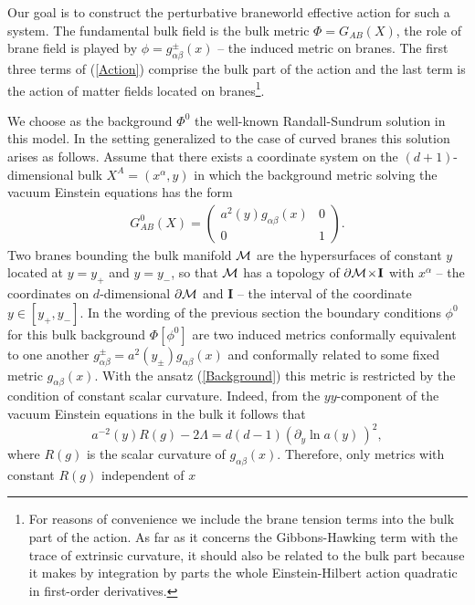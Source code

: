 \documentclass[a4paper,12pt]{article}
\newcommand{\za}{{\alpha}}   %
\newcommand{\zb}{{\beta}}    %
\newcommand{\ZA}{{A}}   %
\newcommand{\ZB}{{B}}   %
\newcommand{\p}{{+}}
\newcommand{\n}{{-}}
\newcommand{\ddim}{{d}}
\newcommand{\M}{{\cal M}}
\newcommand{\dM}{{\partial \cal M}}
\newcommand{\I}{{\mathbf{I}}}
\newcommand{\ddy}{{\partial_y}}
\begin{document}
Our goal is to construct the perturbative braneworld effective
action for such a system. The fundamental bulk field is the bulk
metric $\Phi=G_{\ZA\ZB}(X)$, the role of brane field is played by
$\phi=g^\pm_{\za\zb}(x)$ -- the induced metric on branes. The
first three terms of (\ref{Action}) comprise the bulk part of the
action and the last term is the action of matter fields located on
branes\footnote{For reasons of convenience we include the brane
tension terms into the bulk part of the action. As far as it
concerns the Gibbons-Hawking term with the trace of extrinsic
curvature, it should also be related to the bulk part because it
makes by integration by parts the whole Einstein-Hilbert action
quadratic in first-order derivatives.}.

We choose as the background $\Phi^0$ the well-known
Randall-Sundrum solution in this model. In the setting generalized
to the case of curved branes this solution arises as follows.
Assume that there exists a coordinate system on the
$(d+1)$-dimensional bulk $X^\ZA=(x^\za,y)$ in which the background
metric solving the vacuum Einstein equations has the form
    \begin{eqnarray}
     G^0_{\ZA\ZB}(X)= \left(\begin{array}{cc}
     a^2(y)g_{\za\zb}(x) & 0\\
     0 & 1 \end{array}\right).        \label{Background}
    \end{eqnarray}
Two branes bounding the bulk manifold $\M$ are the hypersurfaces of
constant $y$ located at $y=y_\p$ and $y=y_\n$, so that $\M$
has a topology of $\dM\!\times\!\I$ with $x^\za$ -- the
coordinates on $\ddim$-dimensional $\dM$ and $\I$ -- the
interval of the coordinate $y\in[y_\p,y_\n]$. In the wording of
the previous section the boundary conditions $\phi^0$ for this
bulk background $\Phi[\phi^0]$ are two induced metrics conformally
equivalent to one another $g^\pm_{\za\zb}=a^2(y_\pm)g_{\za\zb}(x)$
and conformally related to some fixed metric $g_{\alpha\beta}(x)$. With
the ansatz (\ref{Background}) this metric is restricted by the
condition of constant scalar curvature. Indeed, from the $yy$-component
of the vacuum Einstein equations in the bulk it follows that
    \begin{equation}
     a^{-2}(y)R(g)-2\Lambda =
     \ddim(\ddim-1)\left(\ddy
     \ln a(y)\,\right)^{2},      \label{EquationFora}
    \end{equation}
where $R(g)$ is the scalar curvature of $g_{\alpha\beta}(x)$.
Therefore, only metrics with constant $R(g)$ independent of $x$
\end{document}
